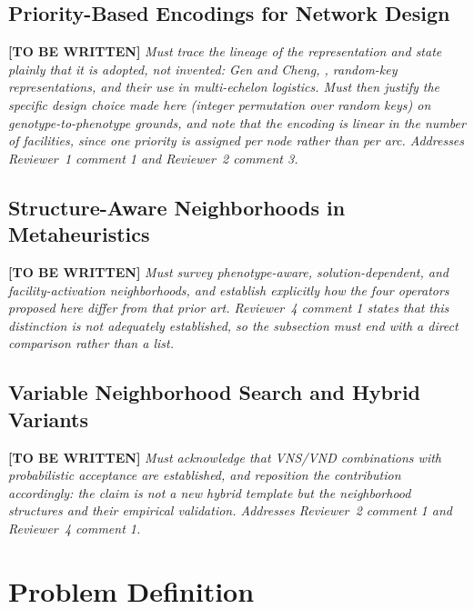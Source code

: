 \documentclass[preprint,12pt,authoryear]{elsarticle}
\begin{document}
\subsection{Priority-Based Encodings for Network Design}
\label{subsec:rw_encoding}

\textbf{[TO BE WRITTEN]} \textit{Must trace the lineage of the representation and state plainly that it is adopted, not invented: Gen and Cheng, \citet{gen2006},
random-key representations, and their use in multi-echelon logistics. Must then justify the specific design choice made here (integer permutation over random
keys) on genotype-to-phenotype grounds, and note that the encoding is linear in the number of facilities, since one priority is assigned per node rather than
per arc. Addresses Reviewer~1 comment 1 and Reviewer~2 comment 3.}

\subsection{Structure-Aware Neighborhoods in Metaheuristics}
\label{subsec:rw_neighborhoods}

\textbf{[TO BE WRITTEN]} \textit{Must survey phenotype-aware, solution-dependent, and facility-activation neighborhoods, and establish explicitly how the four
operators proposed here differ from that prior art. Reviewer~4 comment 1 states that this distinction is not adequately established, so the subsection must
end with a direct comparison rather than a list.}

\subsection{Variable Neighborhood Search and Hybrid Variants}
\label{subsec:rw_vns}

\textbf{[TO BE WRITTEN]} \textit{Must acknowledge that VNS/VND combinations with probabilistic acceptance are established, and reposition the contribution
accordingly: the claim is not a new hybrid template but the neighborhood structures and their empirical validation. Addresses Reviewer~2 comment 1 and
Reviewer~4 comment 1.}

\section{Problem Definition}
\label{sec:problem-definition}
\end{document}
